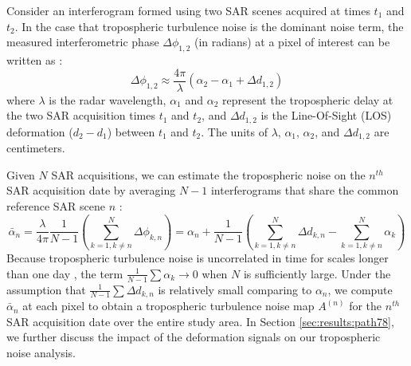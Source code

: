 Consider an interferogram formed using two SAR scenes acquired at times $t_1$ and $t_2$. In the case that tropospheric turbulence noise is the dominant noise term, the measured interferometric phase $ \Delta \phi_{1,2}$ (in radians) at a pixel of interest can be written as \citep{Zebker1997AtmosphericEffectsInterferometric}:
\begin{equation}
	\Delta \phi_{1,2} \approx \frac{4 \pi}{\lambda} \left(\alpha_2 - \alpha_1 + \Delta d_{1,2} \right)
\end{equation}
where $ \lambda $ is the radar wavelength, $\alpha_1$ and $\alpha_2$ represent the tropospheric delay at the two SAR acquisition times $t_1$ and $t_2$, and $\Delta d_{1,2} $ is the Line-Of-Sight (LOS) deformation ($d_2-d_1$) between $t_1$ and $t_2$. The units of $\lambda$, $\alpha_1$, $\alpha_2$, and $\Delta d_{1,2} $ are centimeters.

Given $N$ SAR acquisitions, we can estimate the tropospheric noise on the $n^{th}$ SAR acquisition date by averaging $N-1$ interferograms that share the common reference SAR scene $n$ \citep{Tymofyeyeva2015MitigationAtmosphericPhase}:
\begin{equation}
	\bar{\alpha}_n = \frac{\lambda}{4 \pi} \frac{1}{N-1} \left(\sum_{k=1, k \neq n}^{N} \Delta \phi_{k,n}\right)  
	=  \alpha_n  + \frac{1}{N-1} \left( \sum_{k=1, k \neq n}^{N}  \Delta d_{k,n} - \sum_{k=1, k \neq n}^{N}  \alpha_k  \right)  \label{eq:avg-ifg} 
\end{equation}
Because tropospheric turbulence noise is uncorrelated in time for scales longer than one day \citep{Emardson2003NeutralAtmosphericDelay, Onn2006ModelingWaterVapor}, the term $ \frac{1}{N-1} \sum \alpha_k \rightarrow 0$ when $N$ is sufficiently large. 
Under the assumption that $ \frac{1}{N-1} \sum \Delta d_{k,n} $ is relatively small comparing to $\alpha_n$, we compute $ \bar{\alpha}_n $ at each pixel to obtain a tropospheric turbulence noise map $A^{(n)}$ for the $n^{th}$ SAR acquisition date over the entire study area. In Section \ref{sec:results:path78}, we further discuss the impact of the deformation signals on our tropospheric noise analysis.


